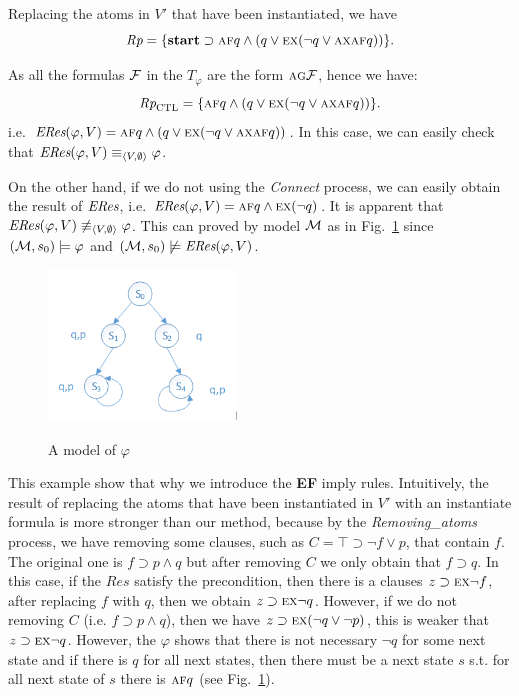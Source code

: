\documentclass[letterpaper]{article} %
\begin{document}
\begin{example}
Replacing the atoms in $V'$ that have been instantiated, we have
\[
\emph{Rp}= \{\textbf{start} \supset  \textsc{a}\textsc{f} q \wedge (q \vee \textsc{e} \textsc{x}(\neg q \vee \textsc{a}\textsc{x} \textsc{a}\textsc{f} q))\}.
\]

As all the formulas $\cal F$ in the $T_{\varphi}$ are the form $\textsc{a}\textsc{g} \cal F$, hence we have:
\[
\emph{Rp}_{\textrm{CTL}} = \{\textsc{a}\textsc{f} q \wedge (q \vee \textsc{e} \textsc{x}(\neg q \vee \textsc{a}\textsc{x} \textsc{a}\textsc{f} q))\}.
\]
i.e. $\emph{ERes}(\varphi, V) = \textsc{a}\textsc{f} q \wedge (q \vee \textsc{e} \textsc{x}(\neg q \vee \textsc{a}\textsc{x} \textsc{a}\textsc{f} q))$.
In this case, we can easily check that $\emph{ERes}(\varphi, V) \equiv_{{\langle{V, \emptyset}\rangle}} \varphi$.


On the other hand, if we do not using the \emph{Connect} process, we can easily obtain the result of $\emph{ERes}$, i.e. $\emph{ERes}(\varphi, V) = \textsc{a}\textsc{f} q \wedge  \textsc{e} \textsc{x}(\neg q)$.
It is apparent that $\emph{ERes}(\varphi, V) \not\equiv_{{\langle{V, \emptyset}\rangle}} \varphi$. This can proved by model ${\cal M}$ as in Fig.~\ref{Fig:models} since $({\cal M}, s_0) \models \varphi$ and $({\cal M}, s_0) \not \models \emph{ERes}(\varphi, V)$.
\begin{figure}
  \centering
  \includegraphics[width=5cm]{models.png}\\
  \caption{A model of $\varphi$}\label{Fig:models}
\end{figure}
\end{example}

This example show that why we introduce the \textbf{EF} imply rules. Intuitively, the result of replacing the atoms that have been instantiated in $V'$ with an instantiate formula is more stronger than our method, because by the \emph{Removing\_atoms} process, we have removing some clauses, such as $C= \top \supset \neg f \vee p$, that contain $f$. The original one is $f \supset p \wedge q$ but after removing $C$ we only obtain that $f \supset q$. In this case, if the $Res$ satisfy the precondition, then there is a clauses $z \supset \textsc{e} \textsc{x} \neg f$, after replacing $f$ with $q$, then we obtain $z \supset \textsc{e} \textsc{x} \neg q$. However, if we do not removing $C$ (i.e. $f \supset p \wedge q$), then we have $z \supset \textsc{e} \textsc{x} (\neg q \vee \neg p)$, this is weaker that $z \supset \textsc{e} \textsc{x} \neg q$.
However, the $\varphi$ shows that there is not necessary $\neg q$ for some next state and if there is $q$ for all next states, then there must be a next state $s$ s.t. for all next state of $s$ there is $\textsc{a}\textsc{f} q$ (see Fig.~\ref{Fig:models}).
\end{document}
